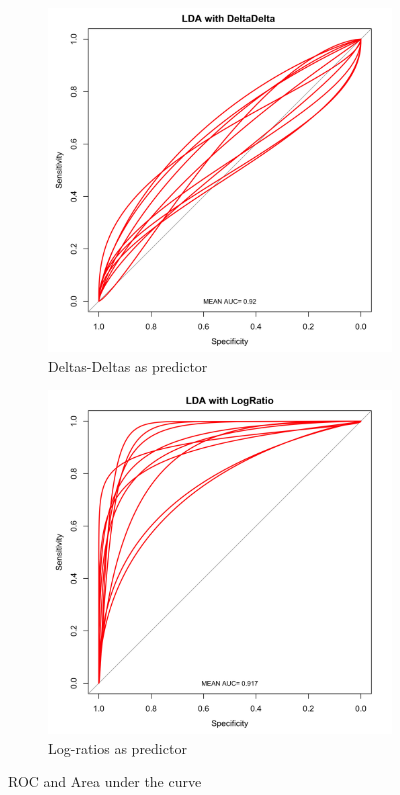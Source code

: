 \documentclass{article}
\begin{document}
\begin{itemize}
\begin{figure}[h]
\begin{subfigure}{0.3\textwidth}
\includegraphics[width=\textwidth]{ROC_LDA-DeltaDelta.png}
\caption{Deltas-Deltas as predictor}
\end{subfigure}
\begin{subfigure}{0.3\textwidth}
\includegraphics[width=\textwidth]{ROC_LDA-LogRatio.png}
\caption{Log-ratios as predictor}
\end{subfigure}
\caption{ROC and Area under the curve}
\end{figure}




\end{itemize}
\end{document}
